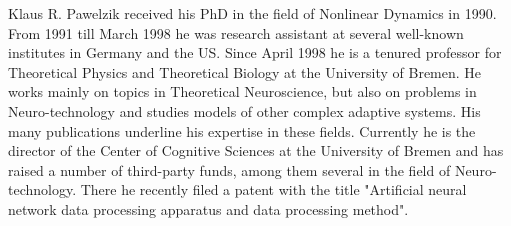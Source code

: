 \begin{IEEEbiography}{Klaus R. Pawelzik}
	received his PhD in the field of Nonlinear Dynamics in
	1990.  From 1991 till March 1998 he was research assistant at several
	well-known institutes in Germany and the US. Since April 1998 he is a
	tenured professor for Theoretical Physics and Theoretical Biology at the
	University of Bremen. He works mainly on topics in Theoretical
	Neuroscience, but also on problems in Neuro-technology and studies
	models of other complex adaptive systems. His many publications
	underline his expertise in these fields. Currently he is the director of
	the Center of Cognitive Sciences at the University of Bremen and has
	raised a number of third-party funds, among them several in the field of
	Neuro-technology. There he recently filed a patent with the title
	"Artificial neural network data processing apparatus and data processing
	method".
\end{IEEEbiography}


